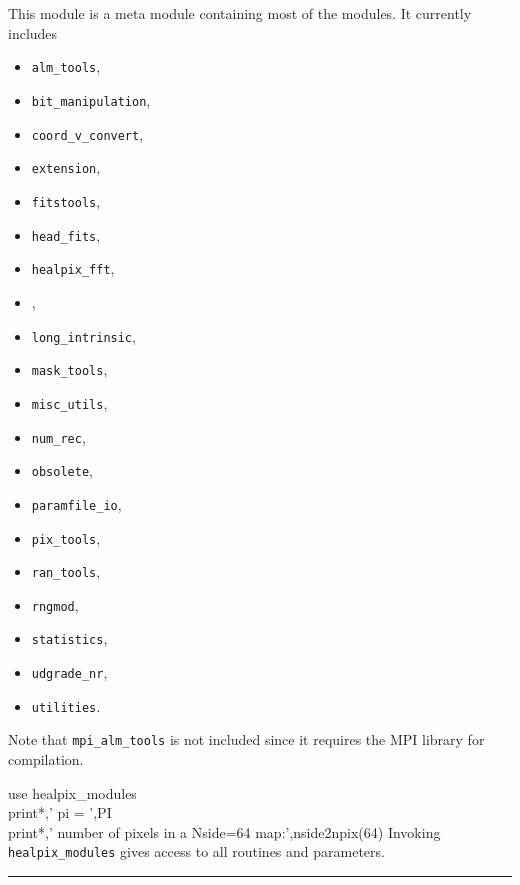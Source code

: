 
\sloppy


 \section[healpix\_modules module]{ }
\label{sub:healpix_modules}
\author{Eric Hivon}

\begin{facility}
{This module is a meta module containing most of the \healpix modules. It currently includes
\begin{itemize}
\setlength{\itemsep}{-5pt}
  \item {\tt{alm\_tools}},
  \item {\tt{bit\_manipulation}},
  \item {\tt{coord\_v\_convert}},
  \item {\tt{extension}},
  \item {\tt{fitstools}},
  \item {\tt{head\_fits}},
  \item {\tt{healpix\_fft}},
  \item {},
  \item {\tt{long\_intrinsic}},
  \item {\tt{mask\_tools}},
  \item {\tt{misc\_utils}},
  \item {\tt{num\_rec}},
  \item {\tt{obsolete}},
  \item {\tt{paramfile\_io}},
  \item {\tt{pix\_tools}},
  \item {\tt{ran\_tools}},
  \item {\tt{rngmod}},
  \item {\tt{statistics}},
  \item {\tt{udgrade\_nr}},
  \item {\tt{utilities}}.
\end{itemize}

Note that {\tt{mpi\_alm\_tools}} is not included since it requires the MPI library for compilation.
}
{\modHealpixModules}
\end{facility}


\begin{example}
{
use healpix\_modules \\
print*,' pi = ',PI \\
print*,' number of pixels in a Nside=64 map:',nside2npix(64)
}
{
Invoking {\tt{healpix\_modules}} gives access to all \healpix routines and parameters.
}
\end{example}


\rule{\hsize}{2mm}

\newpage
